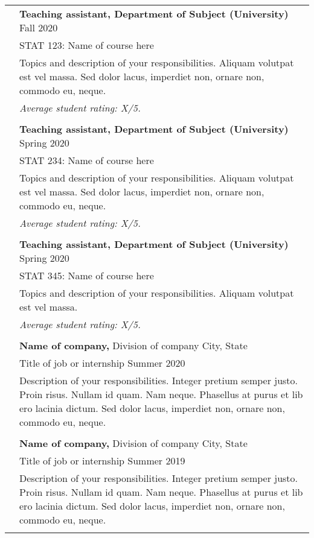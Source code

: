 \documentclass[letterpaper, 11pt]{article}
\begin{document}
\begin{longtable}{p{1.3in}p{4.8in}}
{\color{OliveGreen}{Teaching experience}} 
& \textbf{Teaching assistant, Department of Subject (University)} \hfill Fall 2020 \\
& STAT 123: Name of course here \\
& Topics and description of your responsibilities. Aliquam volutpat est vel massa. Sed dolor lacus, imperdiet non, ornare non, commodo eu, neque. \\
& \textit{Average student rating: X/5.} \\
& \\

& \textbf{Teaching assistant, Department of Subject (University)} \hfill Spring 2020 \\
& STAT 234: Name of course here \\
& Topics and description of your responsibilities. Aliquam volutpat est vel massa. Sed dolor lacus, imperdiet non, ornare non, commodo eu, neque. \\
& \textit{Average student rating: X/5.} \\
& \\

& \textbf{Teaching assistant, Department of Subject (University)} \hfill Spring 2020 \\
& STAT 345: Name of course here \\
& Topics and description of your responsibilities. Aliquam volutpat est vel massa. \\
& \textit{Average student rating: X/5.} \\
& \\


{\color{OliveGreen}{Industry experience}} 
& {\textbf{Name of company,}} Division of company \hfill City, State \\
& Title of job or internship \hfill Summer 2020 \\
& Description of your responsibilities. Integer pretium semper justo. Proin risus. Nullam id quam. Nam neque. Phasellus at purus et lib ero lacinia dictum. Sed dolor lacus, imperdiet non, ornare non, commodo eu, neque. \\
& \\
 
& {\textbf{Name of company,}} Division of company \hfill City, State \\
& Title of job or internship \hfill Summer 2019 \\
& Description of your responsibilities. Integer pretium semper justo. Proin risus. Nullam id quam. Nam neque. Phasellus at purus et lib ero lacinia dictum. Sed dolor lacus, imperdiet non, ornare non, commodo eu, neque. \\
& \\


\end{longtable}
\end{document}
